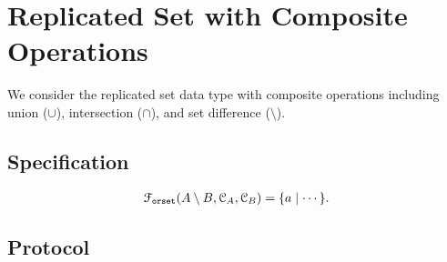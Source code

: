 
\section{Replicated Set with Composite Operations}

We consider the replicated set data type with composite operations 
including union ($\cup$), intersection ($\cap$), and set difference ($\setminus$).

\subsection{Specification}	\label{ss:rset-composite-spec}

\begin{align}
  \mathcal{F}_{\texttt{orset}}(A \setminus B, \mathcal{C}_{A}, \mathcal{C}_{B}) = \{ a \mid \cdots \}.
\end{align}

\subsection{Protocol}		\label{ss:rset-composite-protocol}
